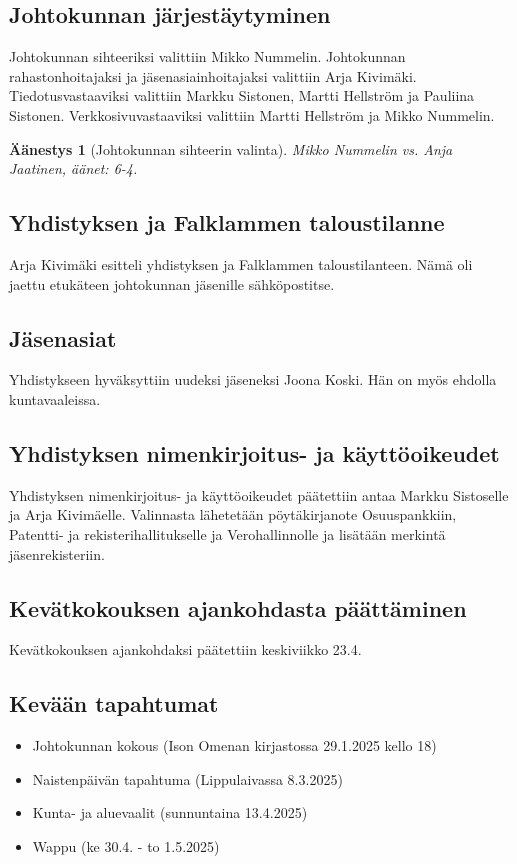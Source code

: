 \documentclass[a4paper,12pt]{article}
\newtheorem{aanestys}{Äänestys}
\begin{document}
\subsection{Johtokunnan järjestäytyminen}
Johtokunnan sihteeriksi valittiin Mikko Nummelin. Johtokunnan rahastonhoitajaksi ja jäsenasiainhoitajaksi valittiin Arja Kivimäki. Tiedotusvastaaviksi valittiin Markku Sistonen, Martti Hellström ja Pauliina Sistonen. Verkkosivuvastaaviksi valittiin Martti Hellström ja Mikko Nummelin.
\begin{aanestys}[Johtokunnan sihteerin valinta]
  Mikko Nummelin vs. Anja Jaatinen, äänet: 6-4.
\end{aanestys}
\subsection{Yhdistyksen ja Falklammen taloustilanne}
Arja Kivimäki esitteli yhdistyksen ja Falklammen taloustilanteen. Nämä oli jaettu etukäteen johtokunnan jäsenille sähköpostitse.
\subsection{Jäsenasiat}
Yhdistykseen hyväksyttiin uudeksi jäseneksi Joona Koski. Hän on myös ehdolla kuntavaaleissa.
\subsection{Yhdistyksen nimenkirjoitus- ja käyttöoikeudet}
Yhdistyksen nimenkirjoitus- ja käyttöoikeudet päätettiin antaa Markku Sistoselle ja Arja Kivimäelle. Valinnasta lähetetään pöytäkirjanote Osuuspankkiin, Patentti- ja rekisterihallitukselle ja Verohallinnolle ja lisätään merkintä jäsenrekisteriin.
\subsection{Kevätkokouksen ajankohdasta päättäminen}
Kevätkokouksen ajankohdaksi päätettiin keskiviikko 23.4.
\subsection{Kevään tapahtumat}
\begin{itemize}
\item{Johtokunnan kokous} (Ison Omenan kirjastossa 29.1.2025 kello 18)
\item{Naistenpäivän tapahtuma} (Lippulaivassa 8.3.2025)
\item{Kunta- ja aluevaalit} (sunnuntaina 13.4.2025)
\item{Wappu} (ke 30.4. - to 1.5.2025)
\end{itemize}
\end{document}
